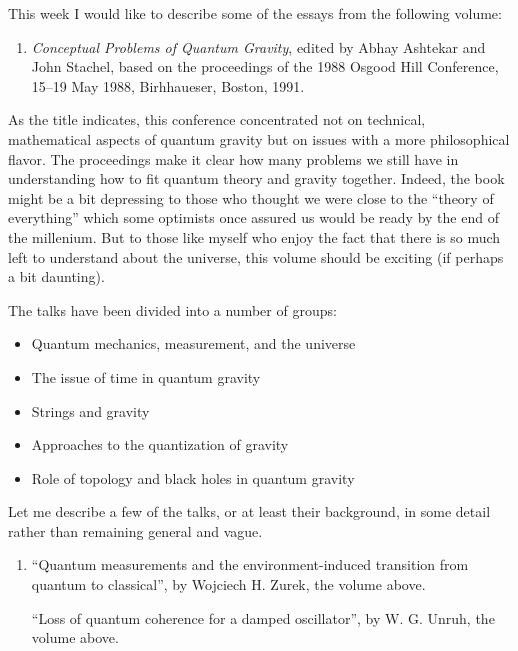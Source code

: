 \documentclass{article}
\def\tightlist{}
\begin{document}
This week I would like to describe some of the essays from the following
volume:

\begin{enumerate}
\def\labelenumi{\arabic{enumi})}
\tightlist
\item
  \emph{Conceptual Problems of Quantum Gravity}, edited by Abhay
  Ashtekar and John Stachel, based on the proceedings of the 1988 Osgood
  Hill Conference, 15--19 May 1988, Birhhaueser, Boston, 1991.
\end{enumerate}

As the title indicates, this conference concentrated not on technical,
mathematical aspects of quantum gravity but on issues with a more
philosophical flavor. The proceedings make it clear how many problems we
still have in understanding how to fit quantum theory and gravity
together. Indeed, the book might be a bit depressing to those who
thought we were close to the ``theory of everything'' which some
optimists once assured us would be ready by the end of the millenium.
But to those like myself who enjoy the fact that there is so much left
to understand about the universe, this volume should be exciting (if
perhaps a bit daunting).

The talks have been divided into a number of groups:

\begin{itemize}
\tightlist
\item
  Quantum mechanics, measurement, and the universe
\item
  The issue of time in quantum gravity
\item
  Strings and gravity
\item
  Approaches to the quantization of gravity
\item
  Role of topology and black holes in quantum gravity
\end{itemize}

Let me describe a few of the talks, or at least their background, in
some detail rather than remaining general and vague.

\begin{enumerate}
\def\labelenumi{\arabic{enumi})}
\setcounter{enumi}{1}
\item
  ``Quantum measurements and the environment-induced transition from
  quantum to classical'', by Wojciech H. Zurek, the volume above.

  ``Loss of quantum coherence for a damped oscillator'', by W. G. Unruh,
  the volume above.
\end{enumerate}
\end{document}
